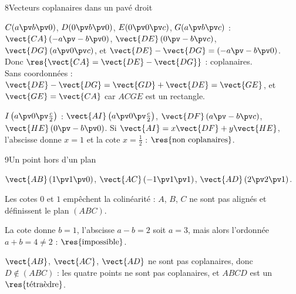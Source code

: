 \begin{deuxcolonnes}
\begin{corrige}{8}{Vecteurs coplanaires dans un pavé droit}
\begin{questions}
  \item $C(a\pv b\pv0)$, $D(0\pv b\pv0)$, $E(0\pv0\pv c)$, $G(a\pv b\pv c)$ :\\ $\vect{CA}\,(-a\pv-b\pv0)$, $\vect{DE}\,(0\pv-b\pv c)$,
    $\vect{DG}\,(a\pv0\pv c)$, et $\vect{DE}-\vect{DG}=(-a\pv-b\pv0)$. Donc $\res{\vect{CA}=\vect{DE}-\vect{DG}}$ : coplanaires.\\
    Sans coordonnées : $\vect{DE}-\vect{DG}=\vect{GD}+\vect{DE}=\vect{GE}$, et $\vect{GE}=\vect{CA}$ car $ACGE$ est un
    rectangle.
  \item $I\left(a\pv0\pv\frac c2\right)$ : $\vect{AI}\left(a\pv0\pv\frac c2\right)$, $\vect{DF}\,(a\pv-b\pv c)$,
    $\vect{HE}\,(0\pv-b\pv0)$. Si $\vect{AI}=x\vect{DF}+y\vect{HE}$, l'abscisse donne $x=1$ et la cote $x=\frac12$ :
    $\res{\text{non coplanaires}}$.
\end{questions}
\end{corrige}

\begin{corrige}{9}{Un point hors d'un plan}
\begin{questions}
  \item $\vect{AB}\,(1\pv1\pv0)$, $\vect{AC}\,(-1\pv1\pv1)$, $\vect{AD}\,(2\pv2\pv1)$.
  \item Les cotes $0$ et $1$ empêchent la colinéarité : $A$, $B$, $C$ ne sont pas alignés et définissent le plan $(ABC)$.
  \item La cote donne $b=1$, l'abscisse $a-b=2$ soit $a=3$, mais alors l'ordonnée $a+b=4\neq2$ : $\res{\text{impossible}}$.
  \item $\vect{AB}$, $\vect{AC}$, $\vect{AD}$ ne sont pas coplanaires, donc $D\notin(ABC)$ : les quatre points ne sont pas
    coplanaires, et $ABCD$ est un $\res{\text{tétraèdre}}$.
\end{questions}
\end{corrige}


\end{deuxcolonnes}
